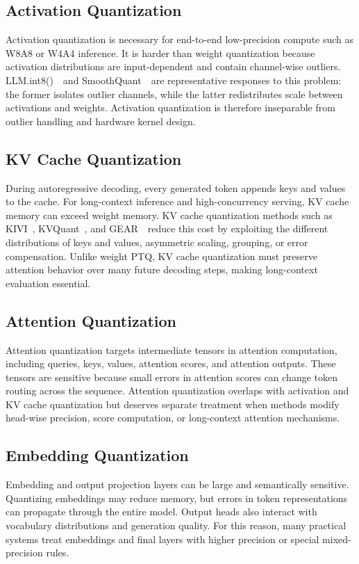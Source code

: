 \documentclass[journal,10pt]{IEEEtran}
\begin{document}
\subsection{Activation Quantization}
Activation quantization is necessary for end-to-end low-precision compute such as W8A8 or W4A4 inference. It is harder than weight quantization because activation distributions are input-dependent and contain channel-wise outliers. LLM.int8()~\cite{dettmers2022llmint8}\ and SmoothQuant~\cite{xiao2022smoothquant}\ are representative responses to this problem: the former isolates outlier channels, while the latter redistributes scale between activations and weights. Activation quantization is therefore inseparable from outlier handling and hardware kernel design.

\subsection{KV Cache Quantization}
During autoregressive decoding, every generated token appends keys and values to the cache. For long-context inference and high-concurrency serving, KV cache memory can exceed weight memory. KV cache quantization methods such as KIVI~\cite{liu2024kivi}, KVQuant~\cite{hooper2024kvquant}, and GEAR~\cite{zhang2024gear}\ reduce this cost by exploiting the different distributions of keys and values, asymmetric scaling, grouping, or error compensation. Unlike weight PTQ, KV cache quantization must preserve attention behavior over many future decoding steps, making long-context evaluation essential.

\subsection{Attention Quantization}
Attention quantization targets intermediate tensors in attention computation, including queries, keys, values, attention scores, and attention outputs. These tensors are sensitive because small errors in attention scores can change token routing across the sequence. Attention quantization overlaps with activation and KV cache quantization but deserves separate treatment when methods modify head-wise precision, score computation, or long-context attention mechanisms.

\subsection{Embedding Quantization}
Embedding and output projection layers can be large and semantically sensitive. Quantizing embeddings may reduce memory, but errors in token representations can propagate through the entire model. Output heads also interact with vocabulary distributions and generation quality. For this reason, many practical systems treat embeddings and final layers with higher precision or special mixed-precision rules.
\end{document}
